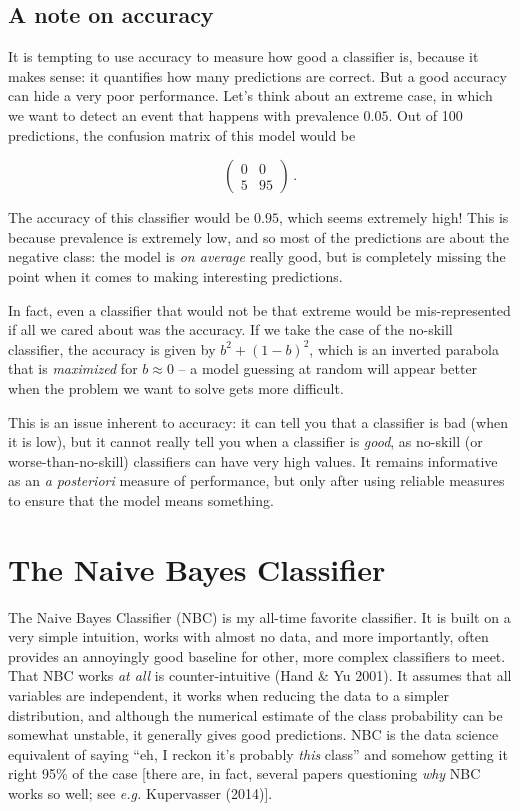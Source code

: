 \documentclass[
  letterpaper,
]{scrbook}
\begin{document}
\subsection{A note on accuracy}\label{sec-classification-accuracy}

It is tempting to use accuracy to measure how good a classifier is,
because it makes sense: it quantifies how many predictions are correct.
But a good accuracy can hide a very poor performance. Let's think about
an extreme case, in which we want to detect an event that happens with
prevalence \(0.05\). Out of 100 predictions, the confusion matrix of
this model would be

\[
\begin{pmatrix}
0 & 0 \\ 5 & 95
\end{pmatrix} \,.
\]

The accuracy of this classifier would be \(0.95\), which seems extremely
high! This is because prevalence is extremely low, and so most of the
predictions are about the negative class: the model is \emph{on average}
really good, but is completely missing the point when it comes to making
interesting predictions.

In fact, even a classifier that would not be that extreme would be
mis-represented if all we cared about was the accuracy. If we take the
case of the no-skill classifier, the accuracy is given by
\(b^2 + (1-b)^2\), which is an inverted parabola that is
\emph{maximized} for \(b \approx 0\) -- a model guessing at random will
appear better when the problem we want to solve gets more difficult.

This is an issue inherent to accuracy: it can tell you that a classifier
is bad (when it is low), but it cannot really tell you when a classifier
is \emph{good}, as no-skill (or worse-than-no-skill) classifiers can
have very high values. It remains informative as an \emph{a posteriori}
measure of performance, but only after using reliable measures to ensure
that the model means something.

\section{The Naive Bayes Classifier}\label{the-naive-bayes-classifier}

The Naive Bayes Classifier (NBC) is my all-time favorite classifier. It
is built on a very simple intuition, works with almost no data, and more
importantly, often provides an annoyingly good baseline for other, more
complex classifiers to meet. That NBC works \emph{at all} is
counter-intuitive (Hand \& Yu 2001). It assumes that all variables are
independent, it works when reducing the data to a simpler distribution,
and although the numerical estimate of the class probability can be
somewhat unstable, it generally gives good predictions. NBC is the data
science equivalent of saying ``eh, I reckon it's probably \emph{this}
class'' and somehow getting it right 95\% of the case {[}there are, in
fact, several papers questioning \emph{why} NBC works so well; see
\emph{e.g.} Kupervasser (2014){]}.
\end{document}
